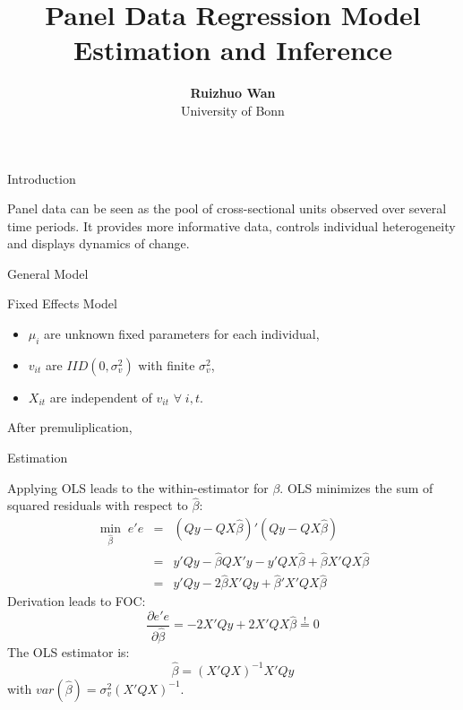 \documentclass[11pt]{beamer}
\begin{document}
\title{Panel Data Regression Model Estimation and Inference}

\author[Ruizhuo Wan]
{
{\bf Ruizhuo Wan}\\
{\small University of Bonn}\\[1ex]
}


\begin{frame}
    \titlepage
    \note{~}
\end{frame}


\begin{frame}
Introduction

Panel data can be seen as the pool of cross-sectional units observed over several time periods. It provides more informative data, controls individual heterogeneity and displays dynamics of change.
\end{frame}

\begin{frame}
General Model




\end{frame}

\begin{frame}
Fixed Effects Model
\begin{itemize}
    \item $\mu_i$ are unknown fixed parameters for each individual,
    \item $v_{it}$ are $IID(0, \sigma_v^2)$ with finite $\sigma_v^2$,
    \item $X_{it}$ are independent of $v_{it}$ $\forall \; i, t$.
\end{itemize}
After premuliplication,

\end{frame}

\begin{frame}
Estimation

Applying OLS leads to the within-estimator for $\beta$.
OLS minimizes the sum of squared residuals with respect to $\widehat{\beta}$:
\begin{eqnarray}
    \min_{\widehat{\beta}}\;e'e&=&(Qy-QX\widehat{\beta})'(Qy-QX\widehat{\beta})\nonumber\\&=&y'Qy-\widehat{\beta}QX'y-y'QX\widehat{\beta}+\widehat{\beta}X'QX\widehat{\beta}\nonumber\\&=&y'Qy-2\widehat{\beta}X'Qy+\widehat{\beta}'X'QX\widehat{\beta}
\end{eqnarray}
Derivation leads to FOC:
\begin{equation}
    \frac{\partial e'e}{\partial \widehat{\beta}}=-2X'Qy+2X'QX\widehat{\beta}\overset{!}{=}0
\end{equation}
The OLS estimator is:
\begin{equation}
    \widehat{\beta}=(X'QX)^{-1}X'Qy
\end{equation}
with $var(\widehat{\beta})=\sigma_v^2(X'QX)^{-1}$.
\end{frame}
\end{document}
